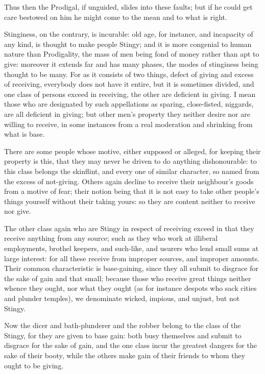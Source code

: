 Thus then the Prodigal, if unguided, slides into these faults; but if he could
get care bestowed on him he might come to the mean and to what is right.

Stinginess, on the contrary, is incurable: old age, for instance, and
incapacity of any kind, is thought to make people Stingy; and it is more
congenial to human nature than Prodigality, the mass of men being fond of money
rather than apt to give: moreover it extends far and has many phases, the modes
of stinginess being thought to be many. For as it consists of two things,
defect of giving and excess of receiving, everybody does not have it entire,
but it is sometimes divided, and one class of persons exceed in receiving, the
other are deficient in giving. I mean those who are designated by such
appellations as sparing, close-fisted, niggards, are all deficient in giving;
but other men’s property they neither desire nor are willing to receive,
in some instances from a real moderation and shrinking from what is base.

There are some people whose motive, either supposed or alleged, for keeping
their property is this, that they may never be driven to do anything
dishonourable: to this class belongs the skinflint, and every one of similar
character, so named from the excess of not-giving. Others again decline to
receive their neighbour’s goods from a motive of fear; their notion being
that it is not easy to take other people’s things yourself without their
taking yours: so they are content neither to receive nor give.

The other class again who are Stingy in respect of receiving exceed in that
they receive anything from any source; such as they who work at illiberal
employments, brothel keepers, and such-like, and usurers who lend small sums at
large interest: for all these receive from improper sources, and improper
amounts. Their common characteristic is base-gaining, since they all submit to
disgrace for the sake of gain and that small; because those who receive great
things neither whence they ought, nor what they ought (as for instance despots
who sack cities and plunder temples), we denominate wicked, impious, and
unjust, but not Stingy.

Now the dicer and bath-plunderer and the robber belong to the class of the
Stingy, for they are given to base gain: both busy themselves and submit to
disgrace for the sake of gain, and the one class incur the greatest dangers for
the sake of their booty, while the others make gain of their friends to whom
they ought to be giving.

